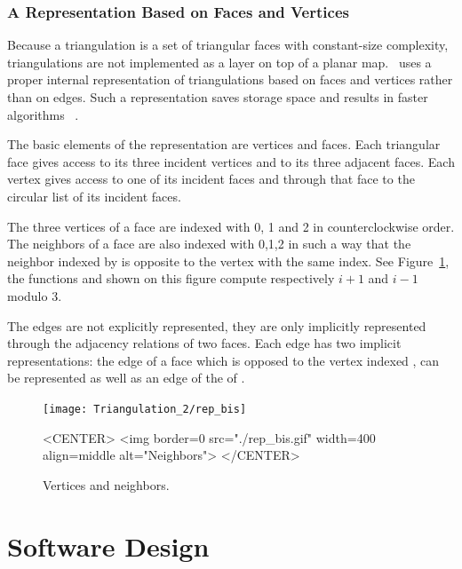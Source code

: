 \subsubsection{A Representation Based on Faces and Vertices}
Because a triangulation is  a set of
triangular faces with constant-size complexity,
triangulations are not implemented
as a layer on top of a planar map.
\cgal\ uses a proper internal
representation of triangulations based on faces and vertices
rather than on edges. Such a  representation
saves storage space and results in faster
algorithms~ \cite{bdty-tcgal-00}.

The basic elements of the representation are vertices and faces.
Each triangular face gives access to its three incident vertices 
and to its three adjacent faces. 
Each vertex gives access to one of its incident faces
and through that face to the circular list of its incident faces.

The three vertices of a face are indexed with 0, 1 and 2
in counterclockwise order. The neighbors of a face are also 
indexed with 0,1,2 in such a way that the neighbor indexed by 
is opposite to the vertex with the same index.
See Figure~\ref{2D_Triangulation_Fig_neighbors1}, 
 the functions 
and  shown  on this figure
compute respectively $i+1$ and $i-1$ modulo 3.

The edges are not explicitly represented, they are only implicitly
represented through the adjacency relations of two faces.
Each edge has two implicit representations: the edge
of a face   which is opposed to the vertex indexed ,
can be represented as well as an edge of the  of 
. 


 \begin{figure}
\begin{ccTexOnly}
    \begin{center}
     \texttt{[image: Triangulation\_2/rep\_bis]} 
    \end{center}
\end{ccTexOnly} 
  \begin{ccHtmlOnly}
<CENTER>
<img border=0  src="./rep_bis.gif" width=400 align=middle alt="Neighbors">
</CENTER>
\end{ccHtmlOnly} 

    \caption{Vertices and neighbors. 
    \label{2D_Triangulation_Fig_neighbors1} }
\end{figure}


\section{Software Design\label{Section_2D_Triangulations_Software_Design}}

